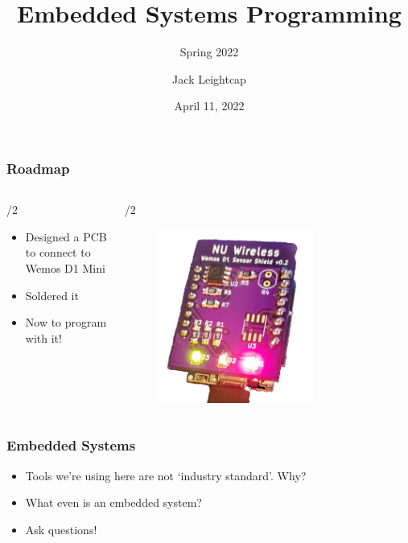 \documentclass{beamer} \usetheme{Madrid}
\title{Embedded Systems Programming}
\subtitle{Spring 2022}
\author[]{Jack Leightcap\inst{1}\inst{2}}
\institute[IEEE, Wireless Club]{
	\inst{1}IEEE -- \url{nuieeeofficers@gmail.com}
	\and
	\inst{2}Wireless Club -- \url{nuwirelessclub@gmail.com}
}
\date[Spring 2022]{April 11, 2022}
\begin{document}
\frame{\titlepage}

\begin{frame}
	\frametitle{Roadmap}
	\begin{columns}[t]
		\begin{column}{{\textwidth}/2}
			\begin{itemize}
				\item Designed a PCB to connect to Wemos D1 Mini
				\item Soldered it
				\item Now to program with it!
			\end{itemize}
		\end{column}
		\begin{column}{{\textwidth}/2}
			\begin{figure}[H]
				\centering
				\includegraphics[width=0.7\textwidth]{board.jpeg}
			\end{figure}
		\end{column}
	\end{columns}
\end{frame}

\begin{frame}
	\frametitle{Embedded Systems}
	\begin{itemize}
		\item Tools we're using here are not `industry standard'. Why?
		\item What even is an embedded system?
		\item Ask questions!
	\end{itemize}
\end{frame}
\end{document}
